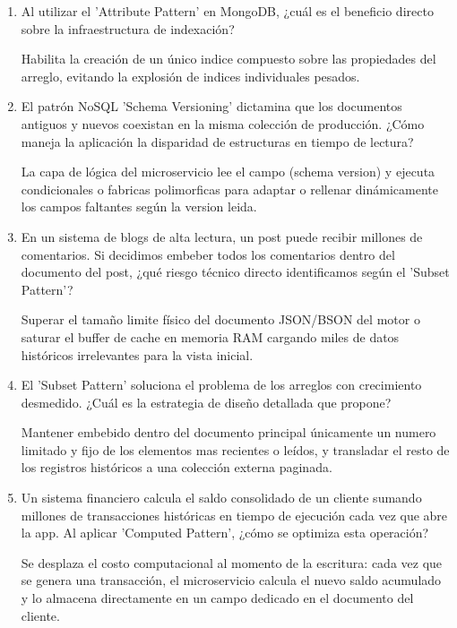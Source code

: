 \begin{enumerate}
se encapsulan las propiedades variables dentro de un arreglo único de subdocumentos con la estructura fija llave-valor \textit{[{"k": "nombrepropiedad", "v": "valor"}]}

\item Al utilizar el 'Attribute Pattern' en MongoDB, ¿cuál es el beneficio directo sobre la infraestructura de indexación?

Habilita la creación de un único indice compuesto sobre las propiedades del arreglo, evitando la explosión de indices individuales pesados.

\item El patrón NoSQL 'Schema Versioning' dictamina que los documentos antiguos y nuevos coexistan en la misma colección de producción. ¿Cómo maneja la aplicación la disparidad de estructuras en tiempo de lectura?

La capa de lógica del microservicio lee el campo (schema version) y ejecuta condicionales o fabricas polimorficas para adaptar o rellenar dinámicamente los campos faltantes según la version leida.

\item En un sistema de blogs de alta lectura, un post puede recibir millones de comentarios. Si decidimos embeber todos los comentarios dentro del documento del post, ¿qué riesgo técnico directo identificamos según el 'Subset Pattern'?

Superar el tamaño limite físico del documento JSON/BSON del motor o saturar el buffer de cache en memoria RAM cargando miles de datos históricos irrelevantes para la vista inicial.

\item El 'Subset Pattern' soluciona el problema de los arreglos con crecimiento desmedido. ¿Cuál es la estrategia de diseño detallada que propone?

Mantener embebido dentro del documento principal únicamente un numero limitado y fijo de los elementos mas recientes o leídos, y transladar el resto de los registros históricos a una colección externa paginada.

\item Un sistema financiero calcula el saldo consolidado de un cliente sumando millones de transacciones históricas en tiempo de ejecución cada vez que abre la app. Al aplicar 'Computed Pattern', ¿cómo se optimiza esta operación?

Se desplaza el costo computacional al momento de la escritura: cada vez que se genera una transacción, el microservicio calcula el nuevo saldo acumulado y lo almacena directamente en un campo dedicado en el documento del cliente.


\end{enumerate}
